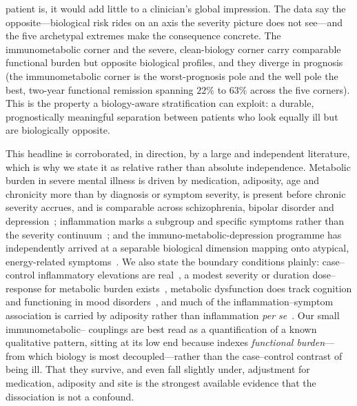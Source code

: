 patient is, it would add little to a clinician's global impression. The data say the
opposite---biological risk rides on an axis the severity picture does not see---and the
five archetypal extremes make the consequence concrete. The immunometabolic corner and
the severe, clean-biology corner carry comparable functional burden but opposite
biological profiles, and they diverge in prognosis (the immunometabolic corner is the
worst-prognosis pole and the well pole the best, two-year functional remission spanning
$22\%$ to $63\%$ across the five corners). This is the property a biology-aware stratification can exploit: a durable, prognostically meaningful separation between patients who look equally ill but are biologically opposite.

This headline is corroborated, in direction, by a large and independent literature,
which is why we state it as relative rather than absolute independence. Metabolic
burden in severe mental illness is driven by medication, adiposity, age and chronicity
more than by diagnosis or symptom severity, is present before chronic severity
accrues, and is comparable across schizophrenia, bipolar disorder and
depression~\citep{vancampfort2015mets,vancampfort2016diabetes,pillinger2017,perry2019,garridotorres2022};
inflammation marks a subgroup and specific symptoms rather than the severity
continuum~\citep{osimo2019,fernandes2016bd,fernandes2016sz}; and the
immuno-metabolic-depression programme has independently arrived at a separable
biological dimension mapping onto atypical, energy-related
symptoms~\citep{penninx2024imd,milaneschi2020,lamers2013,lamers2020,milaneschi2017}.
 We also state the boundary conditions
plainly: case--control inflammatory elevations are
real~\citep{howren2009,osimo2020,haapakoski2015}, a modest severity or duration
dose--response for metabolic burden exists~\citep{penninxlange2018,pillinger2022},
metabolic dysfunction does track cognition and functioning in mood
disorders~\citep{maksyutynska2024}, and much of the inflammation--symptom association
is carried by adiposity rather than inflammation \emph{per
se}~\citep{kappelmann2021,zagaria2024}. Our small immunometabolic--\Gfac{} couplings
are best read as a quantification of a known qualitative pattern, sitting at its low
end because \Gfac{} indexes \emph{functional burden}---from which biology is most
decoupled---rather than the case--control contrast of being ill. That they survive,
and even fall slightly under, adjustment for medication, adiposity and site is the
strongest available evidence that the dissociation is not a confound.

